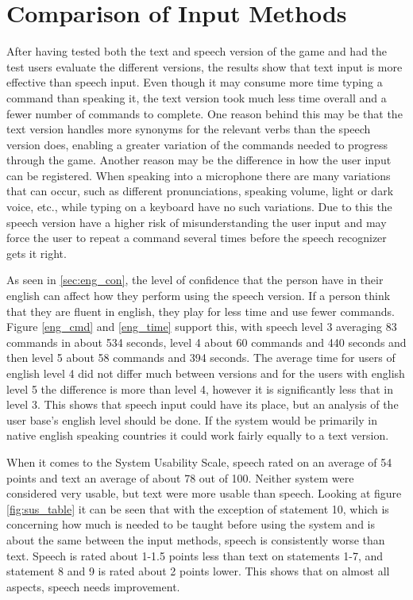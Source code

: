 \section{Comparison of Input Methods} %
After having tested both the text and speech version of the game and had the test users evaluate the different versions, the results show that text input is more effective than speech input. Even though it may consume more time typing a command than speaking it, the text version took much less time overall and a fewer number of commands to complete. One reason behind this may be that the text version handles more synonyms for the relevant verbs than the speech version does, enabling a greater variation of the commands needed to progress through the game. Another reason may be the difference in how the user input can be registered. When speaking into a microphone there are many variations that can occur, such as different pronunciations, speaking volume, light or dark voice, etc., while typing on a keyboard have no such variations. Due to this the speech version have a higher risk of misunderstanding the user input and may force the user to repeat a command several times before the speech recognizer gets it right. 

As seen in \ref{sec:eng_con}, the level of confidence that the person have in their english can affect how they perform using the speech version. If a person think that they are fluent in english, they play for less time and use fewer commands. Figure \ref{eng_cmd} and \ref{eng_time} support this, with speech level 3 averaging 83 commands in about 534 seconds, level 4 about 60 commands and 440 seconds and then level 5 about 58 commands and 394 seconds. The average time for users of english level 4 did not differ much between versions and for the users with english level 5 the difference is more than level 4, however it is significantly less that in level 3. This shows that speech input could have its place, but an analysis of the user base's english level should be done. If the system would be primarily in native english speaking countries it could work fairly equally to a text version.

When it comes to the System Usability Scale, speech rated on an average of 54 points and text an average of about 78 out of 100. Neither system were considered very usable, but text were more usable than speech. Looking at figure \ref{fig:sus_table} it can be seen that with the exception of statement 10, which is concerning how much is needed to be taught before using the system and is about the same between the input methods, speech is consistently worse than text. Speech is rated about 1-1.5 points less than text on statements 1-7, and statement 8 and 9 is rated about 2 points lower. This shows that on almost all aspects, speech needs improvement. 

